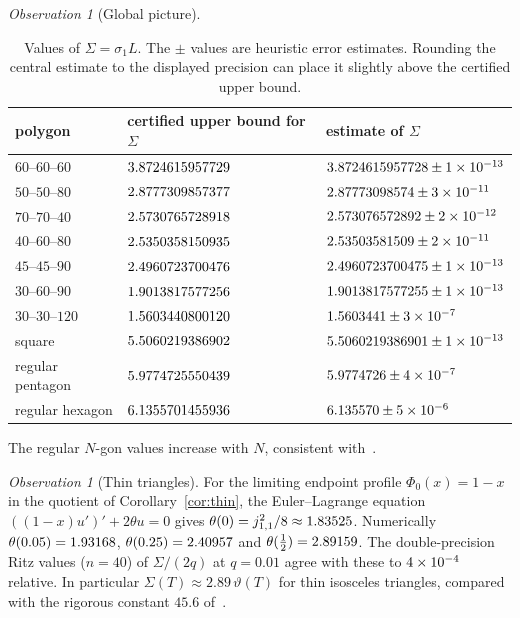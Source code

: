 \documentclass[11pt]{article}
\theoremstyle{definition}
\theoremstyle{remark}
\newtheorem{observation}[theorem]{Observation}
\begin{document}
\begin{observation}[Global picture]
\begin{table}[htbp]
\centering
\begin{tabular}{lll}
\toprule polygon & certified upper bound for $\Sigma$ & estimate of $\Sigma$\\\midrule
$60$--$60$--$60$ & $3.8724615957729$ & $3.8724615957728\pm1\times10^{-13}$\\
$50$--$50$--$80$ & $2.8777309857377$ & $2.87773098574\pm3\times10^{-11}$\\
$70$--$70$--$40$ & $2.5730765728918$ & $2.573076572892\pm2\times10^{-12}$\\
$40$--$60$--$80$ & $2.5350358150935$ & $2.53503581509\pm2\times10^{-11}$\\
$45$--$45$--$90$ & $2.4960723700476$ & $2.4960723700475\pm1\times10^{-13}$\\
$30$--$60$--$90$ & $1.9013817577256$ & $1.9013817577255\pm1\times10^{-13}$\\
$30$--$30$--$120$ & $1.5603440800120$ & $1.5603441\pm3\times10^{-7}$\\
\midrule
square & $5.5060219386902$ & $5.5060219386901\pm1\times10^{-13}$\\
regular pentagon & $5.9774725550439$ & $5.9774726\pm4\times10^{-7}$\\
regular hexagon & $6.1355701455936$ & $6.135570\pm5\times10^{-6}$\\
\bottomrule
\end{tabular}
\caption{Values of $\Sigma=\sigma_1L$. The $\pm$ values are heuristic error estimates.
Rounding the central estimate to the displayed precision can place it slightly above the certified upper bound.}\label{tab:values}
\end{table}

\smallskip
The regular $N$-gon values increase with $N$, consistent with~\cite{CGHLY}.
\end{observation}

\begin{observation}[Thin triangles]
For the limiting endpoint profile $\Phi_0(x)=1-x$ in the quotient of Corollary~\ref{cor:thin}, the
Euler--Lagrange equation $((1-x)u')'+2\theta u=0$ gives $\theta(0)=j_{1,1}^2/8\approx1.83525$. Numerically
$\theta(0.05)=1.93168$, $\theta(0.25)=2.40957$ and $\theta(\frac12)=2.89159$. The double-precision Ritz values ($n=40$)
of $\Sigma/(2q)$ at $q=0.01$ agree with these to $4\times10^{-4}$ relative. In particular
$\Sigma(T)\approx2.89\,\vartheta(T)$ for thin isosceles triangles, compared with the rigorous constant $45.6$
of~\cite{DGMRV}.
\end{observation}
\end{document}
